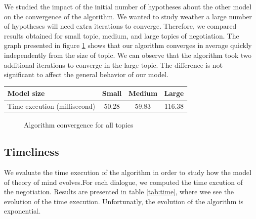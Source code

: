 \documentclass[conference, letterpaper]{IEEEtran}
\begin{document}
We studied the impact of the initial number of hypotheses about the other model on the convergence of the algorithm. We wanted to study weather a large number of hypotheses will need extra iterations to converge. Therefore, we compared results obtained for small topic, medium, and large topics of negotiation. The graph presented in figure \ref{fig:converge} shows that our algorithm converges in average quickly independently from the size of topic. We can observe that the algorithm took two additional iterations to converge in the large topic. The difference is not significant to affect the general behavior of our model.
\begin{table}
	\begin{tabular}{|p{2 cm}|c|c|c|}
		\hline
		Model size & Small & Medium & Large \\
		\hline
		Time execution (millisecond) & 50.28 &	59.83 &	116.38\\
		\hline
	\end{tabular}
\end{table}

\begin{figure}[]
	\caption{Algorithm convergence for all topics} 
	\label{fig:converge}
\end{figure}


\subsection{Timeliness}
We evaluate the time execution of the algorithm in order to study how the model of theory of mind evolves.For each dialogue, we computed the time excution of the negotiation. Results are presented in table \ref{tab:time}, where wee see the evolution of the time execution. Unfortunatly, the evolution of the algorithm is exponential.
\end{document}
